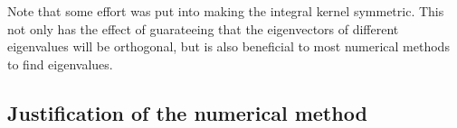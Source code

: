 \documentclass[11pt,a4paper, 
swedish,english %
]{article}
\begin{document}
Note that some effort was put into making the integral
kernel symmetric. This not only has the effect of guarateeing that the
eigenvectors of different eigenvalues will be orthogonal, but is also
beneficial to most numerical methods to find eigenvalues. 





\subsection{Justification of the numerical method}
\end{document}
